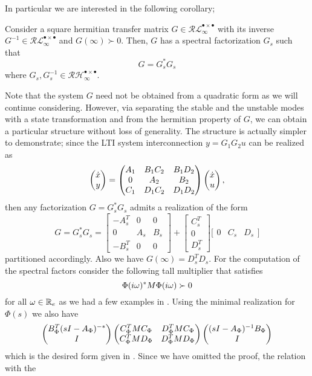 In particular we are interested in the following corollary;
\begin{coroll} Consider a square hermitian transfer matrix $G\in\mathcal{RL}_\infty^{\bullet\times\bullet}$ with its inverse
$G^{-1}\in\mathcal{RL}_\infty^{\bullet\times\bullet}$ and $G(\infty)\succ 0$. Then, $G$ has a spectral factorization $G_s$ such that
\[
G = G_s^*G_s
\]
where $G_s,G_s^{-1}\in\mathcal{RH}_\infty^{\bullet\times\bullet}$.
\end{coroll}

Note that the system $G$ need not be obtained from a quadratic form as we will continue considering. However, via separating
the stable and the unstable modes with a state transformation and from the hermitian property of $G$, we can obtain a particular 
structure without loss of generality. The structure is actually simpler to demonstrate; since the LTI system interconnection 
$y=G_1G_2 u$ can be realized as
\begin{equation}
\begin{pmatrix}\dot{x}\\y\end{pmatrix} = \begin{pmatrix}A_1 &B_1C_2 &B_1D_2\\0 &A_2 &B_2\\C_1 &D_1C_2 &D_1D_2\end{pmatrix}\begin{pmatrix}\dot{x}\\u\end{pmatrix},
\end{equation}
then any factorization $G = G_s^*G_s$ admits a realization of the form
\begin{equation}
G = G_s^*G_s = \left[
\begin{array}{cc|c}
-A_s^T &0 &0\\0 &A_s &B_s\\\hline -B_s^T &0 &0	
\end{array}\right]+
\left[
\begin{array}{c}
C_s^T \\ 0 \\\hline D_s^T
\end{array}
\right]
\bigg[
\begin{array}{cc|c}
0 &C_s &D_s
\end{array}
\bigg]
\end{equation}
partitioned accordingly. Also we have $G(\infty)= D_s^TD_s$. For the computation of the spectral factors 
consider the following tall multiplier that satisfies
\[
\Phi(i\omega)^*M\Phi(i\omega) \succ 0
\]
for all $\omega\in\mathbb{R}_e$ as we had a few examples in . Using the minimal realization for $\Phi(s)$ we also have
\begin{equation}
\begin{pmatrix}B_{\Phi}^T(sI-A_{\Phi})^{-*}\\I\end{pmatrix}
\begin{pmatrix}C_{\Phi}^TMC_{\Phi}&D_{\Phi}^TMC_{\Phi}\\C_{\Phi}^TMD_{\Phi}&D_{\Phi}^TMD_{\Phi}\end{pmatrix}
\begin{pmatrix}(sI-A_{\Phi})^{-1}B_{\Phi}\\I\end{pmatrix}
\label{eq:specfactshuffle}
\end{equation} which is the desired form given in . Since we have omitted the proof, the relation with the 
